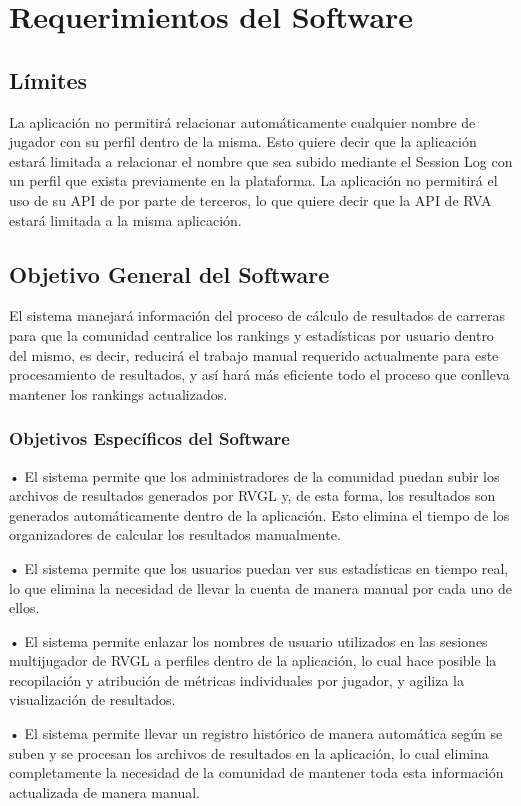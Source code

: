 \chapter{Requerimientos del Software}

\section{Límites}
La aplicación no permitirá relacionar automáticamente cualquier nombre de jugador con su perfil dentro de la misma. Esto quiere decir que la aplicación estará limitada a relacionar el nombre que sea subido mediante el Session Log con un perfil que exista previamente en la plataforma.
La aplicación no permitirá el uso de su API de por parte de terceros, lo que quiere decir que la API de RVA estará limitada a la misma aplicación.

\section{Objetivo General del Software}
El sistema manejará información del proceso de cálculo de resultados de carreras para que la comunidad centralice los rankings y estadísticas por usuario dentro del mismo, es decir, reducirá el trabajo manual requerido actualmente para este procesamiento de resultados, y así hará más eficiente todo el proceso que conlleva mantener los rankings actualizados.


\subsection{Objetivos Específicos del Software}
•	El sistema permite que los administradores de la comunidad puedan subir los archivos de resultados generados por RVGL y, de esta forma, los resultados son generados automáticamente dentro de la aplicación. Esto elimina el tiempo de los organizadores de calcular los resultados manualmente.

•	El sistema permite que los usuarios puedan ver sus estadísticas en tiempo real, lo que elimina la necesidad de llevar la cuenta de manera manual por cada uno de ellos.

•	El sistema permite enlazar los nombres de usuario utilizados en las sesiones multijugador de RVGL a perfiles dentro de la aplicación, lo cual hace posible la recopilación y atribución de métricas individuales por jugador, y agiliza la visualización de resultados.

•	El sistema permite llevar un registro histórico de manera automática según se suben y se procesan los archivos de resultados en la aplicación, lo cual elimina completamente la necesidad de la comunidad de mantener toda esta información actualizada de manera manual.


